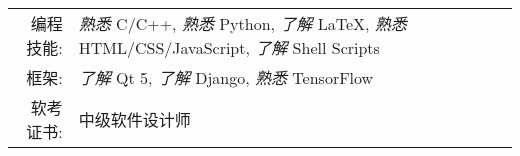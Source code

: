 %
%



\renewcommand{\arraystretch}{1.1}

\begin{tabular}{>{}r>{}p{13cm}}
	\textsc{编程技能:} & \emph{熟悉} C/C++, \emph{熟悉} Python, \emph{了解} \LaTeX, \emph{熟悉} HTML/CSS/JavaScript, \emph{了解} Shell Scripts \\
	\textsc{框架:}     & \emph{了解} Qt 5, \emph{了解} Django, \emph{熟悉} TensorFlow                   \\
	\textsc{软考证书:} & 中级软件设计师                             \\
\end{tabular}

